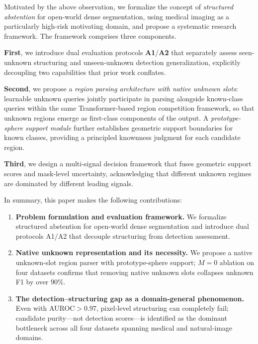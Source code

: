 \documentclass[journal]{IEEEtai}
\begin{document}
Motivated by the above observation, we formalize the concept of \emph{structured abstention}
for open-world dense segmentation, using medical imaging as a particularly high-risk
motivating domain, and propose a systematic research framework.
The framework comprises three components.

\textbf{First}, we introduce dual evaluation protocols \textbf{A1}/\textbf{A2}
that separately assess seen-unknown structuring and unseen-unknown detection
generalization, explicitly decoupling two capabilities that prior work conflates.

\textbf{Second}, we propose a \emph{region parsing architecture with native unknown slots}:
learnable unknown queries jointly participate in parsing alongside known-class queries
within the same Transformer-based region competition framework,
so that unknown regions emerge as first-class components of the output.
A \emph{prototype-sphere support module} further establishes geometric support
boundaries for known classes, providing a principled knownness judgment for each
candidate region.

\textbf{Third}, we design a multi-signal decision framework that fuses geometric support
scores and mask-level uncertainty, acknowledging that different unknown regimes are
dominated by different leading signals.


In summary, this paper makes the following contributions:

\begin{enumerate}
  \item \textbf{Problem formulation and evaluation framework.}
  We formalize structured abstention for open-world dense segmentation and introduce
  dual protocols A1/A2 that decouple structuring from detection assessment.

  \item \textbf{Native unknown representation and its necessity.}
  We propose a native unknown-slot region parser with prototype-sphere support;
  $M{=}0$ ablation on four datasets confirms that removing native unknown slots
  collapses unknown F1 by over 90\%.

  \item \textbf{The detection--structuring gap as a domain-general phenomenon.}
  Even with AUROC$>$0.97, pixel-level structuring can completely fail;
  candidate purity---not detection scores---is identified as the dominant bottleneck
  across all four datasets spanning medical and natural-image domains.
\end{enumerate}
\end{document}

